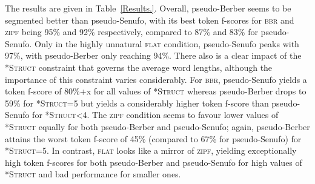 \documentclass[11pt]{article}
\begin{document}
The results are given in Table~\ref{Results.}. Overall, pseudo-Berber seems to be segmented better than pseudo-Senufo, with its best token f-scores for \textsc{bbr} and \textsc{zipf} being 95\% and 92\% respectively, compared to 87\% and 83\% for pseudo-Senufo. Only in the highly unnatural \textsc{flat} condition, pseudo-Senufo peaks with 97\%, with pseudo-Berber only reaching 94\%. There also is a clear impact of the \textsc{*Struct} constraint that governs the average word lengths, although the importance of this constraint varies considerably. For \textsc{bbr}, pseudo-Senufo yields a token f-score of 80\%+x for all values of \textsc{*Struct} whereas pseudo-Berber drops to 59\% for \textsc{*Struct}=5 but yields a considerably higher token f-score than pseudo-Senufo for \textsc{*Struct}<4. The \textsc{zipf} condition seems to favour lower values of \textsc{*Struct} equally for both pseudo-Berber and pseudo-Senufo; again, pseudo-Berber attains the worst token f-score of 45\% (compared to 67\% for pseudo-Senufo) for \textsc{*Struct}=5. In contrast, \textsc{flat} looks like a mirror of \textsc{zipf}, yielding exceptionally high token f-scores for both pseudo-Berber and pseudo-Senufo for high values of \textsc{*Struct} and bad performance for smaller ones.

\end{document}
